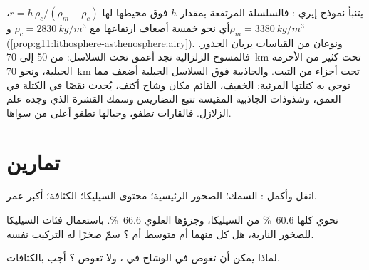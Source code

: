 يتنبأ نموذج إيري : فالسلسلة المرتفعة بمقدار $h$ فوق
محيطها لها  $r = h\,\rho_c/(\rho_m - \rho_c)$، أي نحو خمسة أضعاف
ارتفاعها مع $\rho_c = \qty{2830}{kg/m^3}$ و$\rho_m =
\qty{3380}{kg/m^3}$ (\cref{prop:g11:lithosphere-asthenosphere:airy}). ونوعان
من القياسات يريان الجذور. فالمسوح الزلزالية تجد  أعمق
تحت السلاسل: من 50 إلى \qty{70}{km} تحت كثير من الأحزمة الجبلية، ونحو
\qty{70}{km} تحت أجزاء من التبت. والجاذبية فوق السلاسل الجبلية أضعف مما
توحي به كتلتها المرئية:  الخفيف، القائم مكان
وشاح أكثف، يُحدث نقصًا في الكتلة في العمق، وشذوذات الجاذبية
المقيسة تتبع التضاريس وسمك القشرة الذي وجده
علم الزلازل. فالقارات تطفو، وجبالها تطفو أعلى من سواها.

\section{تمارين}

\begin{exercise}[$\star$]\label{exo:g12:continental-crust:1}
انقل وأكمل  : السمك؛
الصخور الرئيسية؛ محتوى السيليكا؛ الكثافة؛ أكبر عمر.
\end{exercise}

\begin{exercise}[$\star$]\label{exo:g12:continental-crust:2}
تحوي  كلها \qty{60.6}{\percent} من السيليكا، وجزؤها
العلوي \qty{66.6}{\percent}. باستعمال فئات السيليكا للصخور النارية، هل
كل منهما  أم متوسط أم ؟ سمّ صخرًا  له
التركيب نفسه.
\end{exercise}

\begin{exercise}[$\star$]\label{exo:g12:continental-crust:3}
لماذا يمكن أن تغوص  في الوشاح في ، ولا
تغوص ؟ أجب بالكثافات.
\end{exercise}

